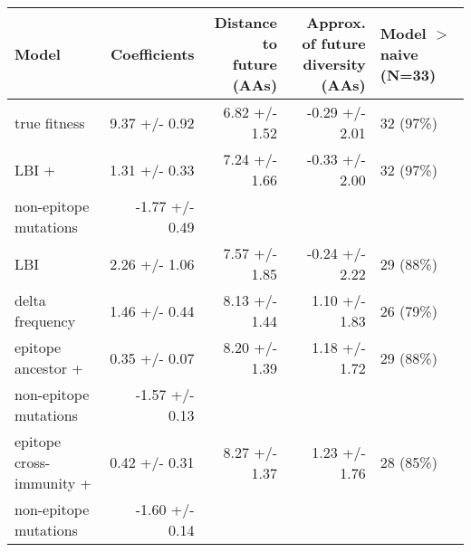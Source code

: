 \begin{tabular*}{1.0\textwidth}{lrrrl}
\toprule
                             Model &    Coefficients & \makecell{Distance to \\ future (AAs)} & \makecell{Approx. of future \\ diversity (AAs)} & \makecell[l]{Model $>$ naive \\ (N=33)} \\
\midrule
                      true fitness &   9.37 +/- 0.92 &                          6.82 +/- 1.52 &                                  -0.29 +/- 2.01 &                               32 (97\%) \\
                             LBI + &   1.31 +/- 0.33 &                          7.24 +/- 1.66 &                                  -0.33 +/- 2.00 &                               32 (97\%) \\
 \hspace{3mm}non-epitope mutations &  -1.77 +/- 0.49 &                                        &                                                 &                                         \\
                               LBI &   2.26 +/- 1.06 &                          7.57 +/- 1.85 &                                  -0.24 +/- 2.22 &                               29 (88\%) \\
                   delta frequency &   1.46 +/- 0.44 &                          8.13 +/- 1.44 &                                   1.10 +/- 1.83 &                               26 (79\%) \\
                epitope ancestor + &   0.35 +/- 0.07 &                          8.20 +/- 1.39 &                                   1.18 +/- 1.72 &                               29 (88\%) \\
 \hspace{3mm}non-epitope mutations &  -1.57 +/- 0.13 &                                        &                                                 &                                         \\
          epitope cross-immunity + &   0.42 +/- 0.31 &                          8.27 +/- 1.37 &                                   1.23 +/- 1.76 &                               28 (85\%) \\
 \hspace{3mm}non-epitope mutations &  -1.60 +/- 0.14 &                                        &                                                 &                                         \\

\end{tabular*}
